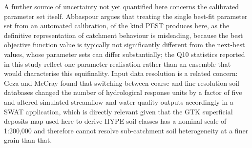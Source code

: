 \documentclass[draft]{agujournal2019}
\begin{document}
A further source of uncertainty not yet quantified here concerns the calibrated parameter set itself. Abbaspour  argues that treating the single best-fit parameter set from an automated calibration, of the kind PEST produces here, as the definitive representation of catchment behaviour is misleading, because the best objective function value is typically not significantly different from the next-best values, whose parameter sets can differ substantially; the Q10 statistics reported in this study reflect one parameter realisation rather than an ensemble that would characterise this equifinality. Input data resolution is a related concern: Geza and McCray  found that switching between coarse and fine-resolution soil databases changed the number of hydrological response units by a factor of five and altered simulated streamflow and water quality outputs accordingly in a SWAT application, which is directly relevant given that the GTK superficial deposits map used here to derive HYPE soil classes has a nominal scale of 1:200,000 and therefore cannot resolve sub-catchment soil heterogeneity at a finer grain than that.
\end{document}
